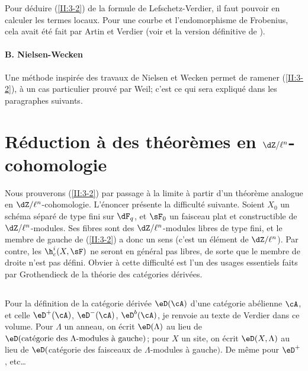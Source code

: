 Pour déduire (\ref{II:3-2}) de la formule de Lefschetz-Verdier, il faut 
pouvoir en calculer les termes locaux. Pour une courbe et l'endomorphisme de 
Frobenius, cela avait été fait par Artin et Verdier (voir  et la version définitive de \cite{sga5}). 


\paragraph{B. Nielsen-Wecken}
Une méthode inspirée des travaux de Nielsen et Wecken permet de ramener 
(\ref{II:3-2}), à un cas particulier prouvé par Weil; c'est ce qui sera 
expliqué dans les paragraphes suivants. 










\section{Réduction à des théorèmes en \texorpdfstring{$\dZ/\ell^n$}{Z/l n}-cohomologie}\label{II:4}

Nous prouverons (\ref{II:3-2}) par passage à la limite à partir d'un 
théorème analogue en $\dZ/\ell^n$-cohomologie. L'énoncer présente la 
difficulté suivante. Soient $X_0$ un schéma séparé de type fini sur 
$\dF_q$, et $\sF_0$ un faisceau plat et constructible de $\dZ/\ell^n$-modules. 
Ses fibres sont des $\dZ/\ell^n$-modules libres de type fini, et le membre de 
gauche de (\ref{II:3-2}) a donc un sens (c'est un élément de $\dZ/\ell^n$). 
Par contre, les $\h_c^i(X,\sF)$ ne seront en général pas libres, de sorte 
que le membre de droite n'est pas défini. Obvier à cette difficulté est 
l'un des usages essentiels faits par Grothendieck de la théorie des 
catégories dérivées.





\subsection{}\label{II:4-1}

Pour la définition de la catégorie dérivée $\eD(\cA)$ d'une catégorie 
abélienne $\cA$, et celle  $\eD^+(\cA)$, $\eD^-(\cA)$, 
$\eD^b(\cA)$, je renvoie au texte de Verdier dans ce volume. Pour $\Lambda$ 
un anneau, on écrit $\eD(\Lambda)$ au lieu de 
$\eD(\text{catégorie des $\Lambda$-modules à gauche})$; pour $X$ un site, on 
écrit $\eD(X,\Lambda)$ au lieu de 
$\eD($catégorie des faisceaux de $\Lambda$-modules à gauche$)$. De 
même pour $\eD^+$, etc\ldots

